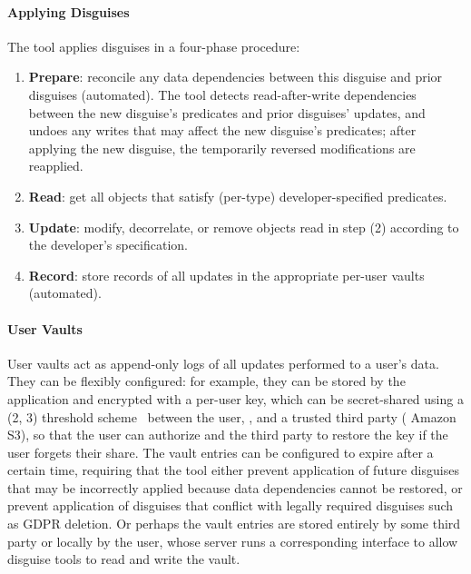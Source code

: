 \paragraph{Applying Disguises}
The tool applies disguises in a four-phase procedure:
\begin{enumerate}
    \item \textbf{Prepare}: reconcile any data dependencies between this disguise and prior disguises (automated).
            The tool detects read-after-write dependencies between the new disguise's predicates and prior disguises'
            updates, and undoes any writes that may affect the new disguise's predicates; after
            applying the new disguise, the temporarily reversed modifications are reapplied.
        \item \textbf{Read}: get all objects that satisfy (per-type) developer-specified predicates.
        \item \textbf{Update}: modify, decorrelate, or remove objects read in step (2) according to the
        developer's specification.
    \item \textbf{Record}: store records of all updates in the appropriate per-user vaults (automated).
\end{enumerate}

\paragraph{User Vaults}
User vaults act as append-only logs of all updates performed to a user's data.
They can be flexibly configured: for example, they can be stored by the application and
encrypted with a per-user key, which can be secret-shared using a (2, 3)
threshold scheme~\cite{secretsharing} between the user, \sys, and a trusted third party (\eg
Amazon S3), so that the user can authorize \sys and the third party to restore the key if
the user forgets their share. The vault entries can be configured to expire after a certain
time, requiring that the tool either prevent application of future disguises that may be incorrectly
applied because data dependencies cannot be restored, or prevent application of disguises that
conflict with legally required disguises such as GDPR deletion.
Or perhaps the vault entries are stored entirely by some third party or locally by the user, whose
server runs a corresponding interface to allow disguise tools to read and write the vault.

